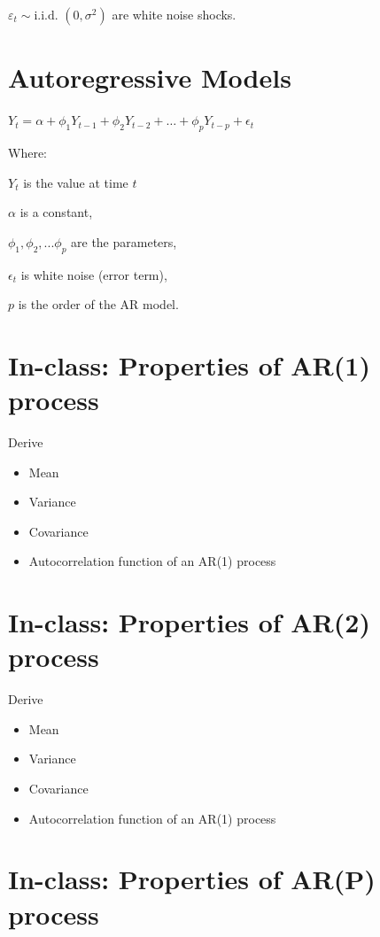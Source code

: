 \documentclass[
  11pt,
  a4paper,
]{report}
\begin{document}
\(\varepsilon_t \sim \text{i.i.d. } (0, \sigma^2)\) are white noise
shocks.

\section{Autoregressive Models}\label{autoregressive-models}

\(Y_t = \alpha + \phi_1 Y_{t-1} + \phi_2 Y_{t-2} + \dots + \phi_p Y_{t-p} + \epsilon_t\)

Where:

\(Y_t\) is the value at time \(t\)

\(\alpha\) is a constant,

\(\phi_1, \phi_2,...\phi_p\) are the parameters,

\(\epsilon_t\) is white noise (error term),

\(p\) is the order of the AR model.

\section{In-class: Properties of AR(1)
process}\label{in-class-properties-of-ar1-process}

Derive

\begin{itemize}
\item
  Mean
\item
  Variance
\item
  Covariance
\item
  Autocorrelation function of an AR(1) process
\end{itemize}

\section{In-class: Properties of AR(2)
process}\label{in-class-properties-of-ar2-process}

Derive

\begin{itemize}
\item
  Mean
\item
  Variance
\item
  Covariance
\item
  Autocorrelation function of an AR(1) process
\end{itemize}

\section{In-class: Properties of AR(P)
process}\label{in-class-properties-of-arp-process}
\end{document}
